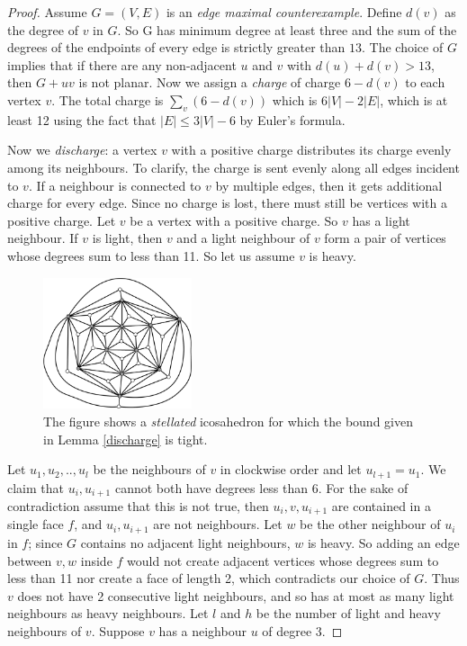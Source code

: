 \documentclass{article}
\newcommand{\0}{\mathbb{0}}
\newcommand{\1}{\mathbb{1}}
\begin{document}
\begin{proof}
 Assume $ G=(V,E)$ is an \emph{edge maximal counterexample}. Define  $d(v)$ as the degree of $v$ in $G$. So G has minimum degree at least three and the sum of the degrees of the endpoints of every edge is strictly greater than $ 13$. The choice of $G$ implies that if there are any non-adjacent $u$ and $v$ with $d(u)+d(v)>13$, then $G+uv$ is not planar. Now we assign a \emph{charge} of charge $6-d(v)$ to each vertex $v$. The total charge is $\sum_v (6-d(v)) $ which is $   6|V| -2|E| $, which is at least 12 using the fact that $|E| \leq 3|V|- 6$ by Euler's formula.
 
  Now we \emph{discharge}: a vertex $v$ with a positive charge distributes its charge evenly among its neighbours. To clarify, the charge is sent evenly along all edges incident to $v$. If a neighbour is connected to $v$ by multiple edges, then it gets additional charge for every edge. Since no charge is lost, there must still be vertices with a positive charge. Let $v$ be a vertex with a positive charge. So $v$ has a light neighbour. If $v$ is light, then $v$ and  a light neighbour of $v$ form a pair of vertices whose degrees sum to less than 11. So let us assume $v$ is heavy.
  
 \begin{figure}
  \begin{center}
   \includegraphics[width=0.39\textwidth]{StellatedIcosehedron.pdf}
   \end{center}
   \caption{\label{StellatedIco} The figure shows a {\em stellated} icosahedron for which the bound given in
   Lemma \ref{discharge} is tight.}
 \end{figure}

 Let $u_1,u_2,..,u_l$ be the neighbours of $v$ in clockwise order and let $u_{l+1}=u_1$. We claim that $u_i,u_{i+1}$ cannot both have degrees less than 6. For the sake of contradiction assume that this is not true, then $ u_i,v,u_{i+1} $ are contained in a single face $f$, and $u_i,u_{i+1}$ are not neighbours. Let $w$ be the other neighbour of $u_i$ in $f$; since $G$ contains no adjacent light neighbours, $w$ is heavy. So adding an edge between $v,w$ inside $f$ would not create adjacent vertices whose degrees sum to less than 11 nor create a face of length 2, which contradicts our choice of $G$.  Thus $v$ does not have 2 consecutive light neighbours, and so has at most as many light neighbours as heavy neighbours.  Let $l$ and $h$ be the number of light and heavy neighbours of $v$. Suppose $v$ has a neighbour $u$ of degree 3. 
 

\end{proof}
\end{document}
